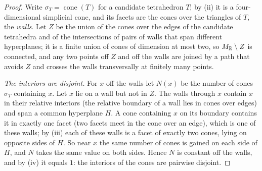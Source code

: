 \begin{proof}
Write $\sigma_T=\operatorname{cone}(T)$ for a candidate tetrahedron $T$; by (ii) it is a four-dimensional simplicial cone, and
its facets are the cones over the triangles of $T$, the \emph{walls}. Let $Z$ be the union of the cones over the edges of
the candidate tetrahedra and of the intersections of pairs of walls that span different hyperplanes; it is a finite union of
cones of dimension at most two, so $M_\mathbb R\setminus Z$ is connected, and any two points off $Z$ and off the walls are joined by
a path that avoids $Z$ and crosses the walls transversally at finitely many points.

\emph{The interiors are disjoint.} For $x$ off the walls let $N(x)$ be the number of cones $\sigma_T$ containing $x$. Let $x$
lie on a wall but not in $Z$. The walls through $x$ contain $x$ in their relative interiors (the relative boundary of a
wall lies in cones over edges) and span a common hyperplane $H$. A cone containing $x$ on its boundary contains it in
exactly one facet (two facets meet in the cone over an edge), which is one of these walls; by (iii) each of these walls is
a facet of exactly two cones, lying on opposite sides of $H$. So near $x$ the same number of cones is gained on each side of
$H$, and $N$ takes the same value on both sides. Hence $N$ is constant off the walls, and by (iv) it equals $1$: the
interiors of the cones are pairwise disjoint.


\end{proof}
